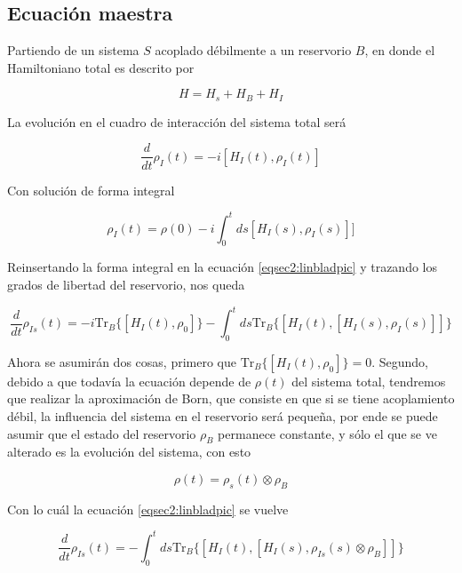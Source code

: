 \subsection{Ecuación maestra}
Partiendo de un sistema $S$ acoplado débilmente a un reservorio $B$, en donde el Hamiltoniano total es descrito por 

\begin{equation*}
    H = H_{s} + H_{B} + H_{I}
\end{equation*}

La evolución en el cuadro de interacción del sistema total será

\begin{equation}
    \frac{d}{dt}\rho_{I}(t) = -i[H_{I}(t), \rho_{I}(t)]
    \label{eqsec2:linbladpic}
\end{equation}

Con solución de forma integral

\begin{equation*}
    \rho_{I}(t) = \rho(0) - i \int_{0}^{t} ds[H_{I}(s), \rho_{I}(s)]]
\end{equation*}

Reinsertando la forma integral en la ecuación \ref{eqsec2:linbladpic} y trazando los grados de libertad del reservorio, nos queda

\begin{equation}
    \frac{d}{dt}\rho_{Is}(t) = -i \text{Tr}_{B}\{[H_{I}(t),\rho_{0}] \}  -  \int_{0}^{t}ds \text{Tr}_{B}\{[H_{I}(t), [H_{I}(s),\rho_{I}(s)]]\}
\end{equation}

Ahora se asumirán dos cosas, primero que $\text{Tr}_{B}\{[H_{I}(t),\rho_{0}] \} = 0$. Segundo, debido a que todavía la ecuación depende de $\rho(t)$ del sistema total, tendremos que realizar la aproximación de Born, que consiste en que si se tiene acoplamiento débil, la influencia del sistema en el reservorio será pequeña, por ende se puede asumir que el estado del reservorio $\rho_{B}$ permanece constante, y sólo el que se ve alterado es la evolución del sistema, con esto

\begin{equation*}
    \rho(t) = \rho_{s}(t)\otimes \rho_{B}
\end{equation*}

Con lo cuál la ecuación \ref{eqsec2:linbladpic} se vuelve

\begin{equation}
    \frac{d}{dt}\rho_{Is}(t) = -  \int_{0}^{t}ds \text{Tr}_{B}\{[H_{I}(t), [H_{I}(s),\rho_{Is}(s) \otimes \rho_{B}]]\}
\end{equation} 

